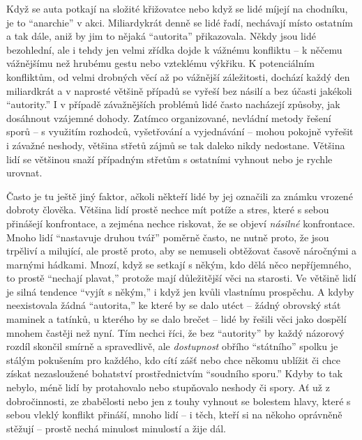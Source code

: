 \documentclass{book}
\begin{document}
Když se auta potkají na složité křižovatce nebo když se lidé míjejí na chodníku, je to \enquote{anarchie} v akci. Miliardykrát denně se lidé řadí, nechávají místo ostatním a tak dále, aniž by jim to nějaká \enquote{autorita} přikazovala. Někdy jsou lidé bezohlední, ale i tehdy jen velmi zřídka dojde k vážnému konfliktu -- k něčemu vážnějšímu než hrubému gestu nebo vzteklému výkřiku. K potenciálním konfliktům, od velmi drobných věcí až po vážnější záležitosti, dochází každý den miliardkrát a v naprosté většině případů se vyřeší bez násilí a bez účasti jakékoli \enquote{autority.} I v případě závažnějších problémů lidé často nacházejí způsoby, jak dosáhnout vzájemné dohody. Zatímco organizované, nevládní metody řešení sporů -- s využitím rozhodců, vyšetřování a vyjednávání -- mohou pokojně vyřešit i závažné neshody, většina střetů zájmů se tak daleko nikdy nedostane. Většina lidí se většinou snaží případným střetům s ostatními vyhnout nebo je rychle urovnat.

Často je tu ještě jiný faktor, ačkoli někteří lidé by jej označili za známku vrozené dobroty člověka. Většina lidí prostě nechce mít potíže a stres, které s sebou přinášejí konfrontace, a zejména nechce riskovat, že se objeví \emph{násilné} konfrontace. Mnoho lidí \enquote{nastavuje druhou tvář} poměrně často, ne nutně proto, že jsou trpěliví a milující, ale prostě proto, aby se nemuseli obtěžovat časově náročnými a marnými hádkami. Mnozí, když se setkají s někým, kdo dělá něco nepříjemného, to prostě \enquote{nechají plavat,} protože mají důležitější věci na starosti. Ve většině lidí je silná tendence \enquote{vyjít s někým,} i když jen kvůli vlastnímu prospěchu. A kdyby neexistovala žádná \enquote{autorita,} ke které by se dalo utéct -- žádný obrovský stát maminek a tatínků, u kterého by se dalo brečet -- lidé by řešili věci jako dospělí mnohem častěji než nyní. Tím nechci říci, že bez \enquote{autority} by každý názorový rozdíl skončil smírně a spravedlivě, ale \emph{dostupnost} obřího \enquote{státního} spolku je stálým pokušením pro každého, kdo cítí zášť nebo chce někomu ublížit či chce získat nezasloužené bohatství prostřednictvím \enquote{soudního sporu.} Kdyby to tak nebylo, méně lidí by protahovalo nebo stupňovalo neshody či spory. Ať už z dobročinnosti, ze zbabělosti nebo jen z touhy vyhnout se bolestem hlavy, které s sebou vleklý konflikt přináší, mnoho lidí -- i těch, kteří si na někoho oprávněně stěžují -- prostě nechá minulost minulostí a žije dál.
\end{document}
